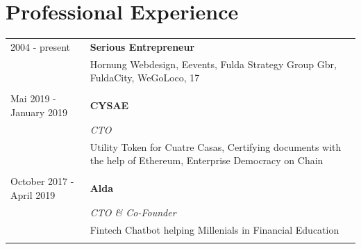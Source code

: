 \documentclass[11pt]{article}
\begin{document}
\section*{Professional Experience}
\begin{tabularx}{\textwidth}{lX}
  2004 - present          & \textbf{Serious Entrepreneur} \\
                          & Hornung Webdesign, Eevents, Fulda Strategy Group
                            Gbr, FuldaCity, WeGoLoco, 17 \\\\
  Mai 2019 - January 2019 & \textbf{CYSAE} \\
                          & \textit{CTO} \\[1mm]
                          & Utility Token for Cuatre Casas, Certifying documents with the help of
                            Ethereum, Enterprise Democracy on Chain\\\\
  October 2017 - April 2019 & \textbf{Alda} \\
                            & \textit{CTO \& Co-Founder} \\[1mm]
                            & Fintech Chatbot helping Millenials in Financial Education\\\\

  
  
  

\end{tabularx}
\end{document}
